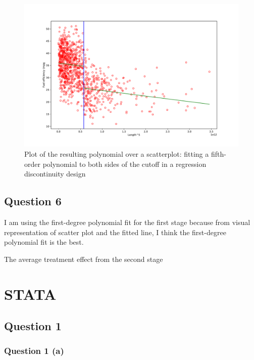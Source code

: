 \documentclass{article}
\begin{document}
\begin{figure}[ht]
    \centering
    \includegraphics[scale = 0.6]{discontinuity_5.pdf}
    \caption{Plot of the resulting polynomial over a scatterplot: fitting a fifth-order polynomial to both sides of the cutoff in a regression discontinuity design}
    \label{fig:discontinuity_5}
\end{figure}

\newpage

\subsection{Question 6 }
I am using the first-degree polynomial fit for the first stage because from visual representation of scatter plot and the fitted line, I think the first-degree polynomial fit is the best.
\begin{table}[ht]
    \centering
    
    \caption{The average treatment effect from the second stage}
    \label{tab:RD6_python}
\end{table}

\newpage

\section{STATA}
\subsection{Question 1 }
\subsubsection{Question 1 (a) }
\end{document}
